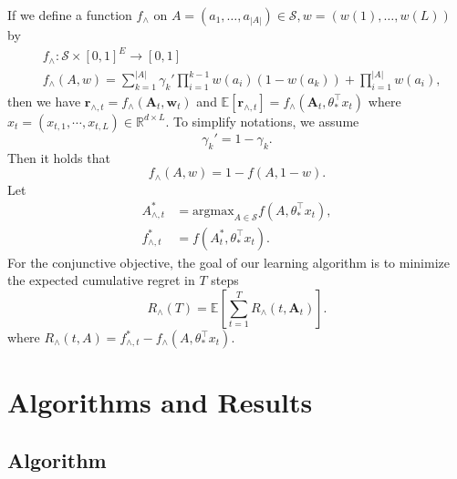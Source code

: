 \documentclass{article}
\newcommand{\EE}{\mathbb{E}}
\newcommand{\RR}{\mathbb{R}}
\newcommand{\bA}{\mathbf{A}}
\newcommand{\br}{\mathbf{r}}
\newcommand{\bw}{\mathbf{w}}
\newcommand{\cS}{\mathcal{S}}
\newcommand{\argmax}{\mathrm{argmax}}
\newcommand{\abs}[1]{\left| #1 \right|}
\begin{document}
If we define a function $f_{\wedge}$ on $A = (a_1, \ldots, a_{\abs{A}}) \in \cS, w = (w(1), \ldots, w(L))$ by
\begin{align}
  &f_{\wedge} : \cS \times [0,1]^E \to [0,1] \nonumber \\
  &f_{\wedge}(A,w) = \sum_{k = 1}^{\abs{A}} \gamma_k' \prod_{i = 1}^{k - 1} w(a_i)(1 - w(a_k)) + \prod_{i=1}^{\abs{A}}w(a_i),
  \label{eq:functionfstar}
\end{align}
then we have $\br_{\wedge, t} = f_{\wedge}(\bA_t, \bw_t)$ and $\EE[\br_{\wedge, t}] = f_{\wedge}(\bA_t, \theta_{\ast}^{\top}x_t)$ where $x_t = (x_{t,1}, \cdots, x_{t,L}) \in \RR^{d \times L}$. To simplify notations, we assume 
$$
  \gamma_k' = 1 - \gamma_k.
$$
Then it holds that
\begin{equation} %
  \label{eq:ConDisRelation}
  f_{\wedge}(A, w) = 1 - f(A, 1 - w).
\end{equation}
Let 
\begin{align*}
  A_{\wedge, t}^{\ast} &= \argmax_{A\in \cS} f(A,\theta_{\ast}^{\top}x_t),\\
  f_{\wedge, t}^{\ast} &= f(A_t^{\ast}, \theta_{\ast}^{\top}x_t).
\end{align*}
For the conjunctive objective, the goal of our learning algorithm is to minimize the expected cumulative regret in $T$ steps
$$
  R_{\wedge}(T) = \EE\left[\sum_{t=1}^T R_{\wedge}(t, \bA_t)\right].
$$
where $R_{\wedge}(t, A) = f_{\wedge, t}^{\ast} - f_{\wedge}(A, \theta_{\ast}^{\top}x_t)$.



\section{Algorithms and Results}

\subsection{Algorithm}
	
\end{document}
